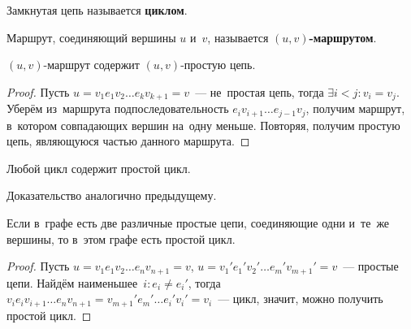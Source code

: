 \begin{definition}
	Замкнутая цепь называется \textbf{циклом}.
\end{definition}

\begin{definition}
	Маршрут, соединяющий вершины $u$ и~$v$, называется \textbf{$(u, v)$\nobreakdash-\hspace{0pt}маршрутом}.
\end{definition}

\begin{lemma}
	$(u, v)$\nobreakdash-\hspace{0pt}маршрут содержит $(u, v)$\nobreakdash-\hspace{0pt}простую цепь.
\end{lemma}
\begin{proof}
	Пусть $u = v_1 e_1 v_2 \ldots e_k v_{k+1} = v$~--- не~простая цепь, тогда $\exists i < j \colon v_i = v_j$.
	Уберём из~маршрута подпоследовательность $e_i v_{i+1} \ldots e_{j-1} v_j$, получим маршрут, в~котором совпадающих вершин на~одну меньше.
	Повторяя, получим простую цепь, являющуюся частью данного маршрута.
\end{proof}

\begin{lemma}
	Любой цикл содержит простой цикл.
\end{lemma}%
	Доказательство аналогично предыдущему.
	
\begin{lemma}
	Если в~графе есть две различные простые цепи, соединяющие одни и~те~же вершины, то в~этом графе есть простой цикл.
\end{lemma}
\begin{proof}
	Пусть $u = v_1 e_1 v_2 \ldots e_n v_{n+1} = v$, $u = v_1' e_1' v_2' \ldots e_m' v_{m+1}' = v$~--- простые цепи.
	Найдём наименьшее~$i \colon e_i \neq e_i'$, тогда $v_i e_i v_{i+1} \ldots e_n v_{n+1} = v_{m+1}' e_m' \ldots e_i' v_i' = v_i$~--- цикл, значит, можно получить простой цикл.
\end{proof}